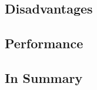 \documentclass[titlepage, a4paper, 11pt]{scrartcl}
\begin{document}
        \subsection{Disadvantages}


        \subsection{Performance}
    


        \subsection{In Summary}

      

            
    
\end{document}

